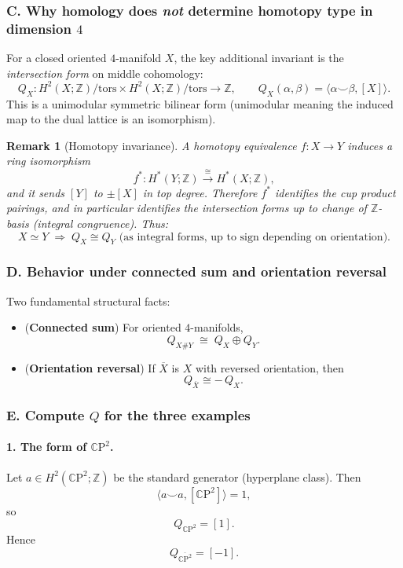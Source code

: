 \documentclass[12pt,a4paper]{article}
\theoremstyle{notespace}
\newtheorem{remark}{Remark}[section]
\newcommand{\CP}{\mathbb{C}\mathrm{P}}
\begin{document}
\subsubsection{C. Why homology does \emph{not} determine homotopy type in dimension $4$}

For a closed oriented $4$-manifold $X$, the key additional invariant is the \emph{intersection form} on middle cohomology:
\[
Q_X: H^2(X;\mathbb Z)/\text{tors} \times H^2(X;\mathbb Z)/\text{tors}\longrightarrow \mathbb Z,
\qquad
Q_X(\alpha,\beta)=\langle \alpha\smile \beta, [X]\rangle.
\]
This is a unimodular symmetric bilinear form (unimodular meaning the induced map to the dual lattice is an isomorphism).

\begin{remark}[Homotopy invariance]
	A homotopy equivalence $f:X\to Y$ induces a ring isomorphism
	\[
	f^*:H^*(Y;\mathbb Z)\xrightarrow{\ \cong\ } H^*(X;\mathbb Z),
	\]
	and it sends $[Y]$ to $\pm [X]$ in top degree. Therefore $f^*$ identifies the cup product pairings, and in particular identifies the intersection forms up to change of $\mathbb Z$-basis (integral congruence). Thus:
	\[
	X\simeq Y \;\Longrightarrow\; Q_X \cong Q_Y \text{ (as integral forms, up to sign depending on orientation).}
	\]
\end{remark}

\subsubsection{D. Behavior under connected sum and orientation reversal}

Two fundamental structural facts:
\begin{itemize}
	\item (\textbf{Connected sum}) For oriented $4$-manifolds,
	\[
	Q_{X\#Y}\;\cong\; Q_X \oplus Q_Y.
	\]
	\item (\textbf{Orientation reversal}) If $\overline{X}$ is $X$ with reversed orientation, then
	\[
	Q_{\overline{X}} \cong -\,Q_X.
	\]
\end{itemize}

\subsubsection{E. Compute $Q$ for the three examples}

\paragraph{1. The form of $\CP^2$.}
Let $a\in H^2(\CP^2;\mathbb Z)$ be the standard generator (hyperplane class). Then
\[
\langle a\smile a, [\CP^2]\rangle = 1,
\]
so
\[
Q_{\CP^2}=[1].
\]
Hence
\[
Q_{\overline{\CP^2}}=[-1].
\]
\end{document}
